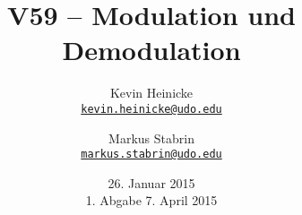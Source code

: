 


\title{%
    V59 -- Modulation und Demodulation
}
\author{%
    Kevin Heinicke\\
    \texttt{\href{mailto:kevin.heinicke@udo.edu}{kevin.heinicke@udo.edu}}
    \and
    Markus Stabrin\\
    \texttt{\href{mailto:markus.stabrin@udo.edu}{markus.stabrin@udo.edu}}
}
\date{%
    26. Januar 2015\\
    {\small 1. Abgabe} 7. April 2015
}

    \maketitle%
    \tableofcontents
    \newpage

    \printbibliography

